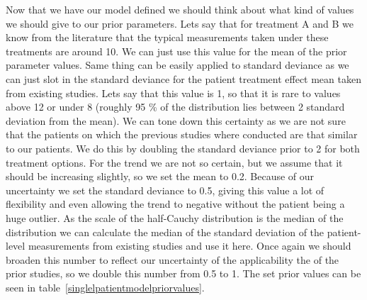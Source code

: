 \documentclass[12pt,a4paper,leqno]{report}
\theoremstyle{plain}
\theoremstyle{definition}
\theoremstyle{remark}
\begin{document}
\bigskip
{}
\bigskip

Now that we have our model defined we should think about what kind of values we should
give to our prior parameters. Lets say that for treatment A and B we know from the
literature that the typical measurements taken under these treatments are around 10. We
can just use this value for the mean of the prior parameter values. Same thing can be
easily applied to standard deviance as we can just slot in the standard deviance for the
patient treatment effect mean taken from existing studies. Lets say that this value is
1, so that it is rare to values above 12 or under 8 (roughly 95 \% of the distribution
lies between 2 standard deviation from the mean). We can tone down this certainty
as we are not sure that the patients on which the previous studies where conducted
are that similar to our patients. We do this by doubling the standard deviance prior to 2 for both
treatment options. For the trend we are not so certain, but we assume that it should be
increasing slightly, so we set the mean to 0.2. Because of our uncertainty we set the
standard deviance to 0.5, giving this value a lot of flexibility and even allowing the trend to
negative without the patient being a huge outlier. As the scale of the half-Cauchy
distribution is the median of the distribution we can calculate the median of
the standard deviation of the patient-level measurements from existing studies and use
it here. Once again we should broaden this number to reflect our uncertainty of the
applicability the of the prior studies, so we double this number from 0.5 to 1.
The set prior values can be seen in table\ \ref{singlelpatientmodelpriorvalues}.
\end{document}
